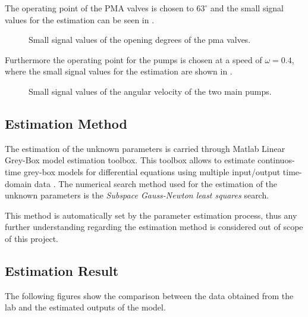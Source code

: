 The operating point of the PMA valves is chosen to $63^{\circ}$ and the small signal values for the estimation can be seen in .

\begin{figure}[H]
\centering
 
\caption{Small signal values of the opening degrees of the pma valves. }
\label{fig:est_OD_data}
\end{figure}

Furthermore the operating point for the pumps is chosen at a speed of $\omega = 0.4$, where the small signal values for the estimation are shown in . 

\begin{figure}[H]
\centering
 
\caption{Small signal values of the angular velocity of the two main pumps.}
\label{fig:est_deltap_data}
\end{figure}

\subsection{Estimation Method}

The estimation of the unknown parameters is carried through Matlab Linear Grey-Box model estimation toolbox. This toolbox allows to estimate continuos-time 
grey-box models for differential equations using multiple input/output time-domain data \cite{LinearEstimation}.
The numerical search method used for the estimation of the unknown parameters is the \textit{Subspace Gauss-Newton least squares} search. 

This method is automatically set by the parameter estimation process, thus any further understanding regarding the estimation method is considered out of 
scope of this project. 


\subsection{Estimation Result}

 

The following figures show the comparison between the data obtained from the lab and the estimated outputs of the model.  

